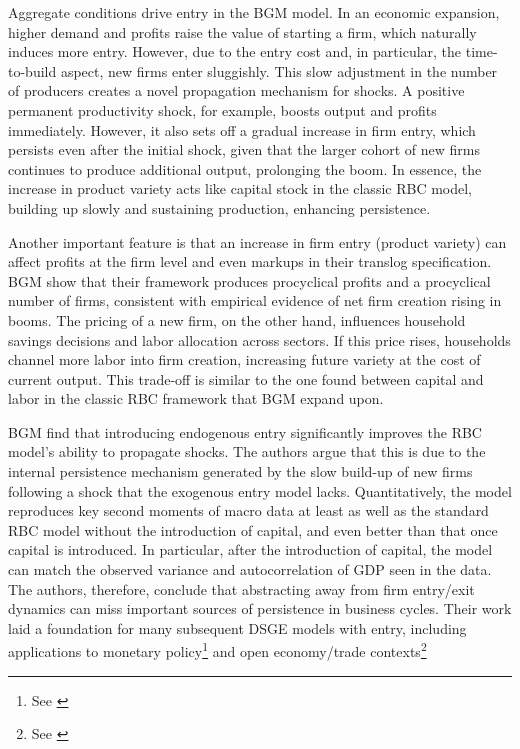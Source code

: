 \documentclass[a4paper,12pt]{article} %
\numberwithin{equation}{section} %
\numberwithin{figure}{section}
\numberwithin{table}{section}
\begin{document}
Aggregate conditions drive entry in the BGM model. In an economic expansion, higher demand and profits raise the value of starting a firm, which naturally induces more entry. 
However, due to the entry cost and, in particular, the time-to-build aspect, new firms enter sluggishly. This slow adjustment in the number of producers creates a novel 
propagation mechanism for shocks. A positive permanent productivity shock, for example, boosts output and profits immediately. However, it also sets off a gradual increase in firm entry, 
which persists even after the initial shock, given that the larger cohort of new firms continues to produce additional output, prolonging the boom. In essence, the increase in 
product variety acts like capital stock in the classic RBC model, building up slowly and sustaining production, enhancing persistence.

Another important feature is that an increase in firm entry (product variety) can affect profits at the firm level and even markups in their translog specification. 
BGM show that their framework produces procyclical profits and a procyclical number of firms, consistent with empirical evidence of net firm creation rising in booms. 
The pricing of a new firm, on the other hand, influences household savings decisions and labor allocation across sectors. If this price rises, households channel more 
labor into firm creation, increasing future variety at the cost of current output. This trade-off is similar to the one found between capital and labor in the classic 
RBC framework that BGM expand upon.

BGM find that introducing endogenous entry significantly improves the RBC model's ability to propagate shocks. The authors argue that this is due to the internal 
persistence mechanism generated by the slow build-up of new firms following a shock that the exogenous entry model lacks. Quantitatively, the model reproduces key 
second moments of macro data at least as well as the standard RBC model without the introduction of capital, and even better than that once capital is introduced. 
In particular, after the introduction of capital, the model can match the observed variance and autocorrelation of GDP seen in the data. The authors, therefore, 
conclude that abstracting away from firm entry/exit dynamics can miss important sources of persistence in business cycles. Their work laid a foundation for many 
subsequent DSGE models with entry, including applications to monetary policy\footnote{See \textcite{bilbiie2007monetary,bergin2008extensive,etro2015new}} and 
open economy/trade contexts\footnote{See \textcite{epifani2011trade,bergin2015international}}
\end{document}
